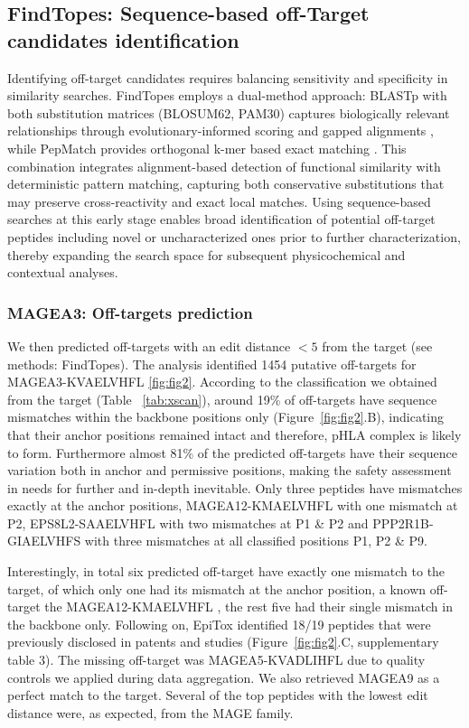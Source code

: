\documentclass[unnumsec,webpdf,contemporary,large]{oup-authoring-template}%
\theoremstyle{thmstyleone}%
\theoremstyle{thmstyletwo}%
\theoremstyle{thmstylethree}%
\begin{document}
    \subsection{\textbf{FindTopes: Sequence-based off-Target candidates identification}}
        Identifying off-target candidates requires balancing sensitivity and specificity in similarity searches. FindTopes employs a dual-method approach: BLASTp with both substitution matrices (BLOSUM62, PAM30) captures biologically relevant relationships through evolutionary-informed scoring and gapped alignments \cite{mahram2015ncbi}, while PepMatch provides orthogonal k-mer based exact matching \cite{marrama2023pepmatch}. This combination integrates alignment-based detection of functional similarity with deterministic pattern matching, capturing both conservative substitutions that may preserve cross-reactivity and exact local matches. Using sequence-based searches at this early stage enables broad identification of potential off-target peptides including novel or uncharacterized ones prior to further characterization, thereby expanding the search space for subsequent physicochemical and contextual analyses.
        
        \subsubsection{\textbf{MAGEA3: Off-targets prediction}}
        We then predicted off-targets with an edit distance $<5$ from the target (see methods: FindTopes). The analysis identified 1454 putative off-targets for MAGEA3-KVAELVHFL \ref{fig:fig2}.
        According to the classification we obtained from the target (Table~ \ref{tab:xscan}), around 19\% of off-targets have sequence mismatches within the backbone positions only (Figure~\ref{fig:fig2}.B), indicating that their anchor positions remained intact and therefore, pHLA complex is likely to form. Furthermore almost 81\% of the predicted off-targets have their sequence variation both in anchor and permissive positions, making the safety assessment in needs for further and in-depth inevitable. Only three peptides have mismatches exactly at the anchor positions, MAGEA12-KMAELVHFL with one mismatch at P2, EPS8L2-SAAELVHFL with two mismatches at P1 \& P2 and PPP2R1B-GIAELVHFS with three mismatches at all classified positions P1, P2 \& P9.
        
        Interestingly, in total six predicted off-target have exactly one mismatch to the target, of which only one had its mismatch at the anchor position, a known off-target the MAGEA12-KMAELVHFL \cite{martin2021re, morgan2013cancer}, the rest five had their single mismatch in the backbone only. Following on, EpiTox identified 18/19 peptides that were previously disclosed in patents and studies (Figure~\ref{fig:fig2}.C, supplementary table 3). The missing off-target was MAGEA5-KVADLIHFL due to quality controls we applied during data aggregation. We also retrieved MAGEA9 as a perfect match to the target. Several of the top peptides with the lowest edit distance were, as expected, from the MAGE family.
        
\end{document}

